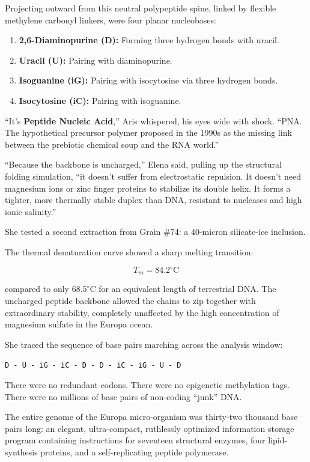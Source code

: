 \documentclass[12pt,twoside,openright]{book}
\providecommand{\tightlist}{\setlength{\itemsep}{0pt}\setlength{\parskip}{0pt}
\setlength{\tabcolsep}{2pt}}
\begin{document}
Projecting outward from this neutral polypeptide spine, linked by
flexible methylene carbonyl linkers, were four planar nucleobases:

\begin{enumerate}
\def\labelenumi{\arabic{enumi}.}
\tightlist
\item
  \textbf{2,6-Diaminopurine (D):} Forming three hydrogen bonds with
  uracil.
\item
  \textbf{Uracil (U):} Pairing with diaminopurine.
\item
  \textbf{Isoguanine (iG):} Pairing with isocytosine via three hydrogen
  bonds.
\item
  \textbf{Isocytosine (iC):} Pairing with isoguanine.
\end{enumerate}

``It's \textbf{Peptide Nucleic Acid},'' Aris whispered, his eyes wide
with shock. ``PNA. The hypothetical precursor polymer proposed in the
1990s as the missing link between the prebiotic chemical soup and the
RNA world.''

``Because the backbone is uncharged,'' Elena said, pulling up the
structural folding simulation, ``it doesn't suffer from electrostatic
repulsion. It doesn't need magnesium ions or zinc finger proteins to
stabilize its double helix. It forms a tighter, more thermally stable
duplex than DNA, resistant to nucleases and high ionic salinity.''

She tested a second extraction from Grain \#74: a 40-micron silicate-ice
inclusion.

The thermal denaturation curve showed a sharp melting transition:

\[T_m = 84.2^\circ\text{C}\]

compared to only \(68.5^\circ\text{C}\) for an equivalent length of
terrestrial DNA. The uncharged peptide backbone allowed the chains to
zip together with extraordinary stability, completely unaffected by the
high concentration of magnesium sulfate in the Europa ocean.

She traced the sequence of base pairs marching across the analysis
window:

\passthrough{\lstinline!D - U - iG - iC - D - D - iC - iG - U - D!}

There were no redundant codons. There were no epigenetic methylation
tags. There were no millions of base pairs of non-coding ``junk'' DNA.

The entire genome of the Europa micro-organism was thirty-two thousand
base pairs long: an elegant, ultra-compact, ruthlessly optimized
information storage program containing instructions for seventeen
structural enzymes, four lipid-synthesis proteins, and a
self-replicating peptide polymerase.
\end{document}

